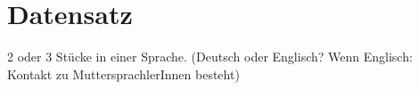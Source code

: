 \chapter{Datensatz}
\label{chap:Datensatz}
\pagestyle{plain}

2 oder 3 Stücke in einer Sprache. (Deutsch oder Englisch? Wenn Englisch: Kontakt zu MuttersprachlerInnen besteht)